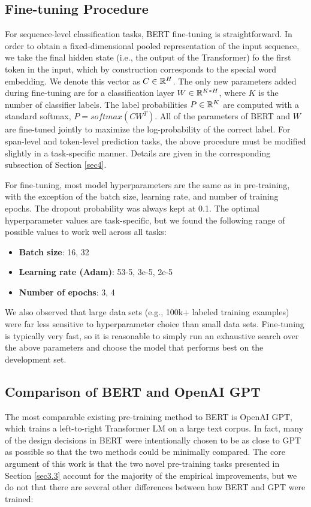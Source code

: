 	\subsection {Fine-tuning Procedure} \label{sec3.5}
	For sequence-level classification tasks, BERT fine-tuning is straightforward. In order to obtain a fixed-dimensional pooled representation of the input sequence, we take the final hidden state (i.e., the output of the Transformer) fo the first token in the input, which by construction corresponds to the special {\selectfont [CLS]} word embedding. We denote this vector as $C \in \mathbb{R}^H$. The only new parameters added during fine-tuning are for a classification layer $W \in \mathbb{R}^{K*H}$, where $K$ is the number of classifier labels. The label probabilities $P \in \mathbb{R}^K$ are computed with a standard softmax, $P=softmax(CW^T)$. All of the parameters of BERT and $W$ are fine-tuned jointly to maximize the log-probability of the correct label. For span-level and token-level prediction tasks, the above procedure must be modified slightly in a task-specific manner. Details are given in the corresponding subsection of Section \ref{sec4}.
	
	For fine-tuning, most model hyperparameters are the same as in pre-training, with the exception of the batch size, learning rate, and number of training epochs. The dropout probability was always kept at 0.1. The optimal hyperparameter values are task-specific, but we found the following range of possible values to work well across all tasks:
	
		\begin{itemize}
			\item \textbf{Batch size}: 16, 32
			\item \textbf{Learning rate (Adam)}: 53-5, 3e-5, 2e-5
			\item \textbf{Number of epochs}: 3, 4
		\end{itemize}
		
	We also observed that large data sets (e.g., 100k+ labeled training examples) were far less sensitive to hyperparameter choice than small data sets. Fine-tuning is typically very fast, so it is reasonable to simply run an exhaustive search over the above parameters and choose the model that performs best on the development set.
	
	\subsection {Comparison of BERT and OpenAI GPT} \label{sec3.6}
	The most comparable existing pre-training method to BERT is OpenAI GPT, which trains a left-to-right Transformer LM on a large text corpus. In fact, many of the design decisions in BERT were intentionally chosen to be as close to GPT as possible so that the two methods could be minimally compared. The core argument of this work is that the two novel pre-training tasks  presented in Section \ref{sec3.3} account for the majority of the empirical improvements, but we do not that there are several other differences between how BERT and GPT were trained:
	
